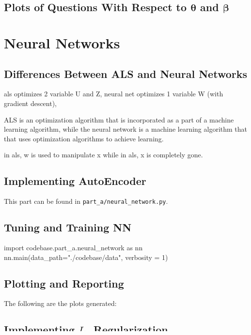 \documentclass{article}
\begin{document}
    \subsection{Plots of Questions With Respect to $\bm{\theta}$ and $\bm{\beta}$}


    \pagebreak

    \section{Neural Networks}
    \subsection{Differences Between ALS and Neural Networks}
    
    als optimizes 2 variable U and Z, neural net optimizes 1 variable W (with gradient descent),

    ALS is an optimization algorithm that is incorporated as a part of a machine learning algorithm, while the neural network is a machine learning algorithm that that uses optimization algorithms to achieve learning.

    in als, w is used to manipulate x while in als, x is completely gone.

    \subsection{Implementing AutoEncoder}
    This part can be found in \verb|part_a/neural_network.py|.

    \subsection{Tuning and Training NN}
    \begin{pylabblock}
        import codebase.part_a.neural_network as nn
        nn.main(data_path="./codebase/data", verbosity = 1)
    \end{pylabblock}
    \printpythontex[verb]

    \subsection{Plotting and Reporting}
    The following are the plots generated:

    
    \subsection{Implementing $L_2$ Regularization}
    $L_2$ regularization has been implemented in the same code file (\verb|part_a/neural_network.py|).
\end{document}
